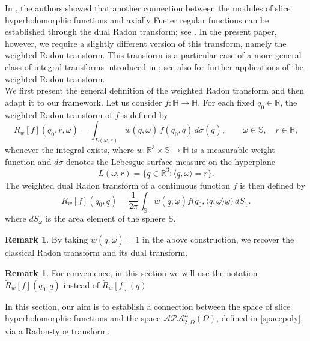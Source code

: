 \documentclass[reqno,11pt]{amsart}
\numberwithin{equation}{section}
\theoremstyle{definition}
\newtheorem{remark}[theorem]{{\bf Remark}}
\begin{document}
In \cite{CLSSmathAn}, the authors showed that another connection between the modules of slice hyperholomorphic functions and axially Fueter regular functions can be established through the dual Radon transform; see \cite{Hradon}. In the present paper, however, we require a slightly different version of this transform, namely the weighted Radon transform. This transform is a particular case of a more general class of integral transforms introduced in \cite{Gel}; see also \cite{Quinto} for further applications of the weighted Radon transform.
\\We first present the general definition of the weighted Radon transform and then adapt it to our framework. Let us consider $f: \mathbb{H} \to \mathbb{H}$. For each fixed $q_0 \in \mathbb{R}$, the weighted Radon transform of $f$ is defined by
$$R_w[f](q_0, r, \underline{\omega})
=\int_{L(\underline{\omega}, r)}
w(\underline{q},\underline{\omega})\, f(q_0, \underline{q}) \, d\sigma(\underline{q}),
\qquad \underline{\omega} \in \mathbb{S}, \quad r \in \mathbb{R},
$$
whenever the integral exists, where $w:\mathbb{R}^3 \times \mathbb{S} \to \mathbb{H}$ is a measurable weight function and $d\sigma$ denotes the Lebesgue surface measure on the hyperplane
$$
L(\underline{\omega}, r)=\{\underline{q} \in \mathbb{R}^3 : \langle \underline{q}, \underline{\omega} \rangle = r\}.
$$
 The weighted dual Radon transform of a continuous function $f$ is then defined by
	\begin{equation}
	\label{Radon}
\breve{R}_{w}[f](q_0,\underline q)=\frac{1}{2\pi}\int_{\mathbb S}w(\underline q, \underline\omega)f\bigl(q_0,\langle\underline q,\underline\omega\rangle\underline\omega\bigr)\,dS_{\underline\omega}.
	\end{equation}
where $dS_{\underline{\omega}}$ is the area element of the sphere $ \mathbb{S}$.

\begin{remark}
By taking $w(\underline{q},\underline{\omega})=1$ in the above construction, we recover the classical Radon transform and its dual transform.
\end{remark}

\begin{remark}
For convenience, in this section we will use the notation $\breve{R}_w[f](q_0,\underline{q})$ instead of $\breve{R}_w[f](q)$.
\end{remark}
In this section, our aim is to establish a connection between the space of slice hyperholomorphic functions and the space $\mathcal{APA}_{2, \overline{D}}^L(\Omega)$, defined in \eqref{spacepoly}, via a Radon-type transform.
\end{document}
